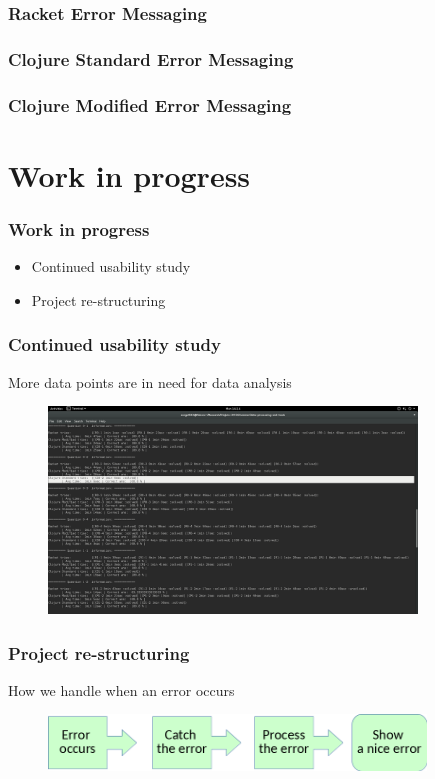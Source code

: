 \documentclass{beamer}
\begin{document}
\begin{frame}
  \frametitle{Racket Error Messaging}
\end{frame}

\begin{frame}
  \frametitle{Clojure Standard Error Messaging}
\end{frame}

\begin{frame}
  \frametitle{Clojure Modified Error Messaging}
\end{frame}




\section{Work in progress}

\begin{frame}
  \frametitle{Work in progress}
\begin{itemize}
\item Continued usability study 
\item Project re-structuring
\end{itemize}
\end{frame}

\begin{frame}
  \frametitle{Continued usability study }
More data points are in need for data analysis
\begin{figure}
\includegraphics[height=55mm]{one-cut.png}
\end{figure}
\end{frame}


\begin{frame}
  \frametitle{Project re-structuring}
How we handle when an error occurs 
\begin{figure}
\includegraphics[height=15mm]{Step.png}
\end{figure}

\end{frame}
\end{document}
